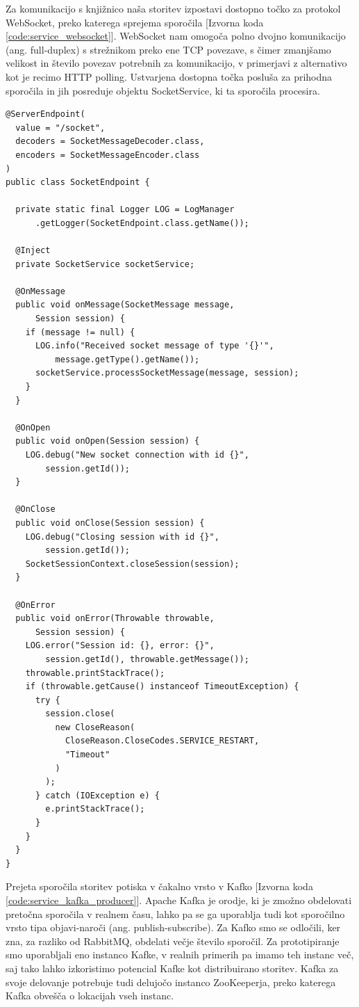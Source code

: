 \documentclass[a4paper, 12pt]{book}
\begin{document}
Za komunikacijo s knjižnico naša storitev izpostavi dostopno točko za protokol WebSocket, preko katerega sprejema sporočila [Izvorna koda \ref{code:service_websocket}]. WebSocket nam omogoča polno dvojno komunikacijo (ang. full-duplex) s strežnikom preko ene TCP povezave, s čimer zmanjšamo velikost in število povezav potrebnih za komunikacijo, v primerjavi z alternativo kot je recimo HTTP polling. Ustvarjena dostopna točka posluša za prihodna sporočila in jih posreduje objektu SocketService, ki ta sporočila procesira.

\begin{lstlisting}[label=code:service_websocket, caption=WebSocket dostopna točka]
@ServerEndpoint(
  value = "/socket",
  decoders = SocketMessageDecoder.class,
  encoders = SocketMessageEncoder.class
)
public class SocketEndpoint {

  private static final Logger LOG = LogManager
      .getLogger(SocketEndpoint.class.getName());

  @Inject
  private SocketService socketService;

  @OnMessage
  public void onMessage(SocketMessage message,
      Session session) {
    if (message != null) {
      LOG.info("Received socket message of type '{}'",
          message.getType().getName());
      socketService.processSocketMessage(message, session);
    }
  }

  @OnOpen
  public void onOpen(Session session) {
    LOG.debug("New socket connection with id {}",
        session.getId());
  }

  @OnClose
  public void onClose(Session session) {
    LOG.debug("Closing session with id {}",
        session.getId());
    SocketSessionContext.closeSession(session);
  }

  @OnError
  public void onError(Throwable throwable,
      Session session) {
    LOG.error("Session id: {}, error: {}",
        session.getId(), throwable.getMessage());
    throwable.printStackTrace();
    if (throwable.getCause() instanceof TimeoutException) {
      try {
        session.close(
          new CloseReason(
            CloseReason.CloseCodes.SERVICE_RESTART,
            "Timeout"
          )
        );
      } catch (IOException e) {
        e.printStackTrace();
      }
    }
  }
}
\end{lstlisting} 

Prejeta sporočila storitev potiska v čakalno vrsto v Kafko [Izvorna koda \ref{code:service_kafka_producer}]. Apache Kafka je orodje, ki je zmožno obdelovati pretočna sporočila v realnem času, lahko pa se ga uporablja tudi kot sporočilno vrsto tipa objavi-naroči (ang. publish-subscribe). Za Kafko smo se odločili, ker zna, za razliko od RabbitMQ, obdelati večje število sporočil. Za prototipiranje smo uporabljali eno instanco Kafke, v realnih primerih pa imamo teh instanc več, saj tako lahko izkoristimo potencial Kafke kot distribuirano storitev. Kafka za svoje delovanje potrebuje tudi delujočo instanco ZooKeeperja, preko katerega Kafka obvešča o lokacijah vseh instanc.
\end{document}
